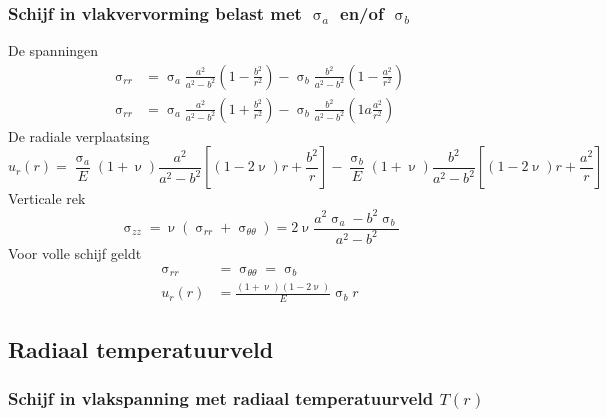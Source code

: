             \subsubsection{Schijf in vlakvervorming belast met $\upsigma_a$ en/of $\upsigma_b$}

                De spanningen
                \begin{align}
                    \upsigma_{rr} &= \upsigma_a\frac{a^2}{a^2-b^2}\left(1-\frac{b^2}{r^2}\right)-\upsigma_b\frac{b^2}{a^2-b^2}\left(1-\frac{a^2}{r^2}\right)\nonumber\\
                    \upsigma_{rr} &= \upsigma_a\frac{a^2}{a^2-b^2}\left(1+\frac{b^2}{r^2}\right)-\upsigma_b\frac{b^2}{a^2-b^2}\left(1a\frac{a^2}{r^2}\right)
                \end{align}
                De radiale verplaatsing
                \begin{equation}
                    u_r(r) = \frac{\upsigma_a}{E}(1+\upnu)\frac{a^2}{a^2-b^2}\left[(1-2\upnu)r+\frac{b^2}{r}\right] -\frac{\upsigma_b}{E}(1+\upnu)\frac{b^2}{a^2-b^2}\left[(1-2\upnu)r+\frac{a^2}{r}\right]
                \end{equation}
                Verticale rek
                \begin{equation}
                    \upsigma_{zz} = \upnu(\upsigma_{rr}+\upsigma_{\theta\theta})=2\upnu\frac{a^2\upsigma_a-b^2\upsigma_b}{a^2-b^2}
                \end{equation}
                Voor volle schijf geldt
                \begin{align}
                    \upsigma_{rr} &= \upsigma_{\theta\theta} = \upsigma_b\nonumber\\
                    u_r(r) &= \frac{(1+\upnu)(1-2\upnu)}{E}\upsigma_b r
                \end{align}

        \subsection{Radiaal temperatuurveld}

            \subsubsection{Schijf in vlakspanning met radiaal temperatuurveld $T(r)$}

